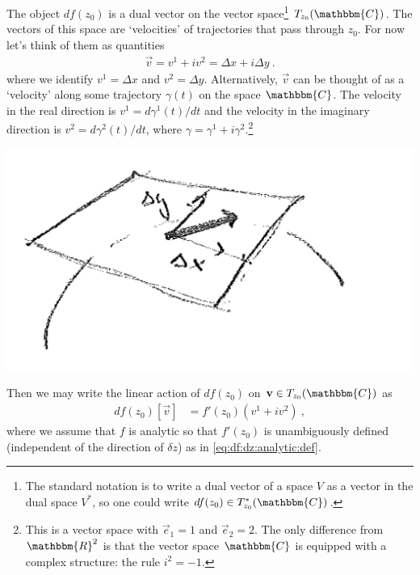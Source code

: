 The object $df(z_0)$ is a dual vector on the vector space\footnote{The standard notation is to write a dual vector of a space $V$ as a vector in the dual space $V^*$, so one could write $df(z_0) \in T^*_{z_0}(\mathbbm{C})$.} $T_{z_0}(\mathbbm{C})$.  The vectors of this space are `velocities' of trajectories that pass through $z_0$. For now let's think of them as quantities
\begin{align}
  \vec v = v^1 + i v^2 = \Delta x + i \Delta y \ .
\end{align}
where we identify $v^1 = \Delta x$ and $v^2 = \Delta y$. Alternatively, $\vec{v}$ can be thought of as a `velocity' along some trajectory $\gamma(t)$ on the space $\mathbbm{C}$. The velocity in the real direction is $v^1 = d\gamma^1(t)/dt$ and the velocity in the imaginary direction is $v^2 = d\gamma^2(t)/dt$, where $\gamma = \gamma^1 + i \gamma^2$.\footnote{This is a vector space with $\vec{e}_{1} = 1$ and  $\vec{e}_{2} = 2$. The only difference from $\mathbbm{R}^2$ is that the vector space $\mathbbm{C}$ is equipped with a complex structure: the rule $i^2 = -1$.}

\begin{center}
\includegraphics[width=.5\textwidth]{figures/lec13_tanvec.png}
\end{center}
Then we may write the linear action of $df(z_0)$ on $\vec v \in T_{z_0}(\mathbbm{C})$ as
\begin{align}
  df(z_0)\left[\vec{v}\right] &=
  f'(z_0)\left(v^1 + i v^2\right)
  \ ,
  \label{eq:diff:geo:CR:1}
\end{align}
where we assume that $f$ is analytic so that $f'(z_0)$ is unambiguously defined (independent of the direction of $\delta z$) as in \eqref{eq:df:dz:analytic:def}. 

